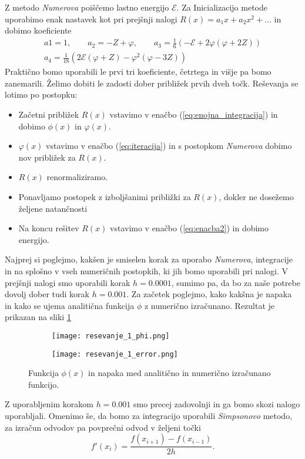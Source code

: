 \documentclass[12pt,a4paper]{article}
\begin{document}
Z metodo \textit{Numerova} poiščemo lastno energijo $\mathcal{E}$. Za Inicializacijo metode uporabimo enak nastavek kot pri prejšnji nalogi $R(x)=a_1x + a_2 x^{2} + \dots$ in dobimo koeficiente
\begin{align*}
a1=1, \qquad a_2= -Z + \varphi, \qquad a_3 = \frac{1}{6}\left( -\mathcal{E}+2\varphi(\varphi +2Z)\right) \\ a_4 = \frac{1}{18}(2\mathcal{E}(\varphi +Z) -\varphi ^{2}(\varphi -3Z))
\end{align*}
Praktično bomo uporabili le prvi tri koeficiente, četrtega in višje pa bomo zanemarili. Želimo dobiti le zadosti dober približek prvih dveh točk. Reševanja se lotimo po postopku:
\begin{itemize}
\item Začetni približek $R(x)$ vstavimo v enačbo (\ref{eq:enojna_integracija}) in dobimo $\phi(x)$ in $\varphi(x)$.
\item $\varphi(x)$ vstavimo v enačbo (\ref{eq:iteracija}) in s postopkom \textit{Numerova} dobimo nov približek za $R(x)$.
\item $R(x)$ renormaliziramo.
\item Ponavljamo postopek z izboljšanimi približki za $R(x)$, dokler ne dosežemo željene natančnosti
\item Na koncu rešitev $R(x)$ vstavimo v enačbo (\ref{eq:enacba2}) in dobimo energijo.
\end{itemize}

Najprej si poglejmo, kakšen je smiselen korak za uporabo \textit{Numerova}, integracije in na splošno v vseh numeričnih postopkih, ki jih bomo uporabili pri nalogi. V prejšnji nalogi smo uporabili korak $h=0.0001$, sumimo pa, da bo za naše potrebe dovolj dober tudi korak $h=0.001$. Za začetek poglejmo, kako kakšna je napaka in kako se ujema analitična funkcija $\phi$ z numerično izračunano. Rezultat je prikazan na sliki \ref{fig:slika2}
\begin{figure}[H]
    \centering
    \begin{subfigure}[b]{0.49\textwidth}
        \texttt{[image: resevanje\_1\_phi.png]}
    \end{subfigure}
    \begin{subfigure}[b]{0.49\textwidth}
        \texttt{[image: resevanje\_1\_error.png]}
    \end{subfigure}
    \caption{Funkcija $\phi(x)$ in napaka med analitično in numerično izračunano funkcijo.} \label{fig:slika2}
\end{figure}
\noindent Z uporabljenim korakom $h=0.001$ smo precej zadovolnji in ga bomo skozi nalogo uporabljali. Omenimo še, da bomo za integracijo uporabili \textit{Simpsonovo} metodo, za izračun odvodov pa povprečni odvod v željeni točki
\begin{equation*}
f'(x_i)=\frac{f(x_{i+1})-f(x_{i-1})}{2h}.
\end{equation*}
\end{document}
